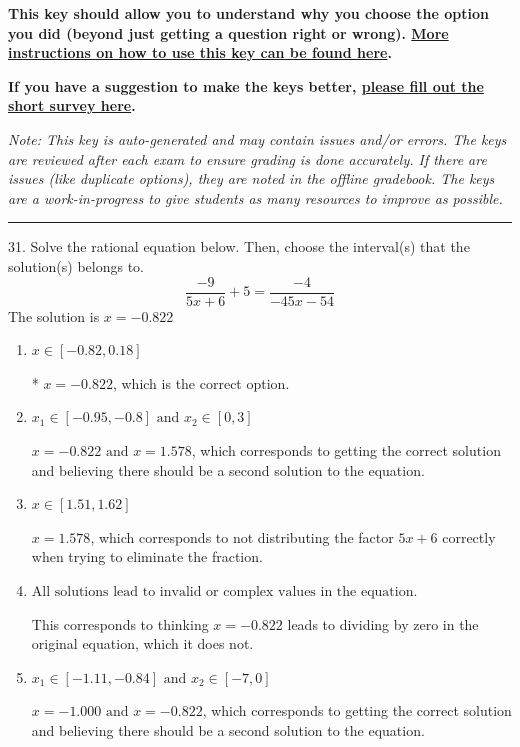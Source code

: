 \documentclass{article}[14pt]
\begin{document}
\textbf{This key should allow you to understand why you choose the option you did (beyond just getting a question right or wrong). \href{https://xronos.clas.ufl.edu/mac1105spring2020/courseDescriptionAndMisc/Exams/LearningFromResults}{More instructions on how to use this key can be found here}.}

\textbf{If you have a suggestion to make the keys better, \href{https://forms.gle/CZkbZmPbC9XALEE88}{please fill out the short survey here}.}

\textit{Note: This key is auto-generated and may contain issues and/or errors. The keys are reviewed after each exam to ensure grading is done accurately. If there are issues (like duplicate options), they are noted in the offline gradebook. The keys are a work-in-progress to give students as many resources to improve as possible.}

\rule{\textwidth}{0.4pt}

31. Solve the rational equation below. Then, choose the interval(s) that the solution(s) belongs to.
$$ \frac{-9}{5x + 6} + 5 = \frac{-4}{-45x -54} $$ 
The solution is $ x = -0.822 $ 

\begin{enumerate}[label=\Alph*.] 
\item $ x \in [-0.82,0.18] $ 

 * $x = -0.822$, which is the correct option. 
\item $ x_1 \in [-0.95, -0.8] \text{ and } x_2 \in [0,3] $ 

 $x = -0.822 \text{ and } x = 1.578$, which corresponds to getting the correct solution and believing there should be a second solution to the equation. 
\item $ x \in [1.51,1.62] $ 

 $x = 1.578$, which corresponds to not distributing the factor $5x + 6$ correctly when trying to eliminate the fraction. 
\item $ \text{All solutions lead to invalid or complex values in the equation.} $ 

 This corresponds to thinking $x = -0.822$ leads to dividing by zero in the original equation, which it does not. 
\item $ x_1 \in [-1.11, -0.84] \text{ and } x_2 \in [-7,0] $ 

 $x = -1.000 \text{ and } x = -0.822$, which corresponds to getting the correct solution and believing there should be a second solution to the equation. 
\end{enumerate} 
 
\end{document}
